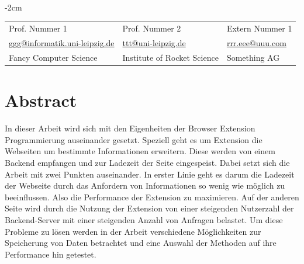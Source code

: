 \documentclass[11pt, a4paper, twoside, openright, final]{book}
\makeatletter
\numberwithin{equation}{chapter}		%
\renewcommand*{\cleardoublepage}{\clearpage\if@twoside \ifodd\c@page\else
\hbox{}%
\thispagestyle{empty}%
\newpage%
\if@twocolumn\hbox{}\newpage\fi\fi\fi}
\newcommand{\1}{\mathbbm{1}}
\makeatother
\begin{document}
\begin{titlepage}
\begin{adjustwidth*}{}{-2cm}
\begin{tabular}{*{3}{C{4cm}}}
			\small Prof. Nummer 1 & 
			\small Prof. Nummer 2 & 
			\small Extern Nummer 1 \\
			
			\small \href{mailto:ggg@informatik.uni-leipzig.de}{ggg@informatik.uni-leipzig.de} & 
			\small \href{mailto:ttt@uni-leipzig.de}{ttt@uni-leipzig.de} &
			\small \href{mailto:rrr.eee@uuu.com}{rrr.eee@uuu.com} \\
			
			\small Fancy Computer Science & 
			\small Institute of Rocket Science & 
			\small Something AG\\
		\end{tabular}
		
		\vspace{1.0cm}
		\centering{\today}
	\end{adjustwidth*}
\end{titlepage}
\cleardoublepage





\setcounter{page}{1}	%

\chapter*{Abstract}
\label{c:abstract}
In dieser Arbeit wird sich mit den Eigenheiten der Browser Extension Programmierung auseinander gesetzt. Speziell geht es um Extension die Webseiten um bestimmte Informationen erweitern. Diese werden von einem Backend empfangen und zur Ladezeit der Seite eingespeist. Dabei setzt sich die Arbeit mit zwei Punkten auseinander. In erster Linie geht es darum die Ladezeit der Webseite durch das Anfordern von Informationen so wenig wie möglich zu beeinflussen. Also die Performance der Extension zu maximieren. Auf der anderen Seite wird durch die Nutzung der Extension von einer steigenden Nutzerzahl der Backend-Server mit einer steigenden Anzahl von Anfragen belastet. Um diese Probleme zu lösen werden in der Arbeit verschiedene Möglichkeiten zur Speicherung von Daten betrachtet und eine Auswahl der Methoden auf ihre Performance hin getestet.




\tableofcontents
\cleardoublepage
\end{document}
